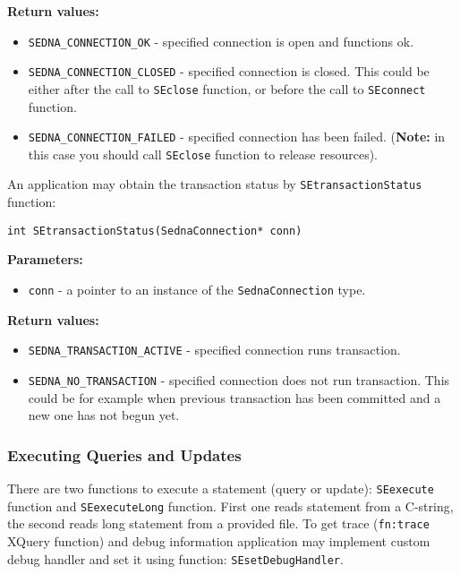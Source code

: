 \documentclass[a4paper,12pt]{article}
\newenvironment{citemize}
{\begin{itemize}
  \setlength{\itemsep}{0pt}
  \setlength{\parskip}{0pt}
  \setlength{\parsep}{0pt}}
{\end{itemize}}
\begin{document}
\noindent
\textbf{Return values:}

\medskip

\begin{citemize}
\item\verb!SEDNA_CONNECTION_OK! - specified connection is open and functions ok.
\item\verb!SEDNA_CONNECTION_CLOSED! - specified connection is closed. This could
be either after the call to \verb!SEclose! function, or before the call to
\verb!SEconnect! function.
\item\verb!SEDNA_CONNECTION_FAILED! - specified connection has been failed.
(\textbf{Note:} in this case you should call \verb!SEclose! function to release
resources).
\end{citemize}

An application may obtain the transaction status by \verb!SEtransactionStatus!
function:

\begin{verbatim}
int SEtransactionStatus(SednaConnection* conn)
\end{verbatim}

\noindent
\textbf{Parameters:}

\begin{citemize}
\item\verb!conn! - a pointer to an instance of the \verb!SednaConnection! type.
\end{citemize}

\noindent
\textbf{Return values:}

\begin{citemize}
\item\verb!SEDNA_TRANSACTION_ACTIVE! - specified connection runs transaction.
\item\verb!SEDNA_NO_TRANSACTION! - specified connection does not run
transaction. This could be for example when previous transaction has been
committed and a new one has not begun yet.
\end{citemize}


\subsubsection{Executing Queries and Updates}
\label{exec-capi}

There are two functions to execute a statement (query or update):
\verb!SEexecute! function and \verb!SEexecuteLong! function. First one reads
statement from a C-string, the second reads long statement from a provided file.
To get trace (\verb!fn:trace! XQuery function) and debug information application
may implement custom debug handler and set it using function:
\verb!SEsetDebugHandler!.
\end{document}
